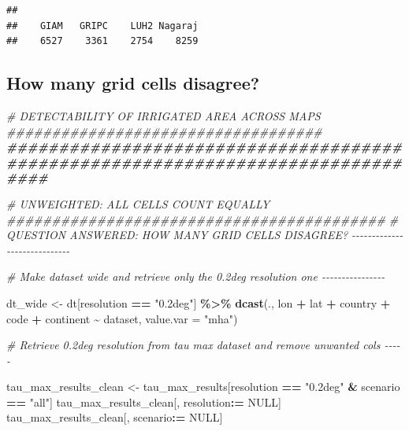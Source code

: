 \documentclass[
  11pt,
]{article}
\newenvironment{Shaded}{\begin{snugshade}}{\end{snugshade}}
\newcommand{\AttributeTok}[1]{\textcolor[rgb]{0.13,0.29,0.53}{#1}}
\newcommand{\CommentTok}[1]{\textcolor[rgb]{0.56,0.35,0.01}{\textit{#1}}}
\newcommand{\ConstantTok}[1]{\textcolor[rgb]{0.56,0.35,0.01}{#1}}
\newcommand{\DocumentationTok}[1]{\textcolor[rgb]{0.56,0.35,0.01}{\textbf{\textit{#1}}}}
\newcommand{\FunctionTok}[1]{\textcolor[rgb]{0.13,0.29,0.53}{\textbf{#1}}}
\newcommand{\NormalTok}[1]{#1}
\newcommand{\OtherTok}[1]{\textcolor[rgb]{0.56,0.35,0.01}{#1}}
\newcommand{\SpecialCharTok}[1]{\textcolor[rgb]{0.81,0.36,0.00}{\textbf{#1}}}
\newcommand{\StringTok}[1]{\textcolor[rgb]{0.31,0.60,0.02}{#1}}
\begin{document}
\begin{verbatim}
## 
##    GIAM   GRIPC    LUH2 Nagaraj 
##    6527    3361    2754    8259
\end{verbatim}

\subsection{How many grid cells
disagree?}\label{how-many-grid-cells-disagree}

\begin{Shaded}
\begin{Highlighting}[]
\CommentTok{\# DETECTABILITY OF IRRIGATED AREA ACROSS MAPS \#\#\#\#\#\#\#\#\#\#\#\#\#\#\#\#\#\#\#\#\#\#\#\#\#\#\#\#\#\#\#\#\#\#\#}
\DocumentationTok{\#\#\#\#\#\#\#\#\#\#\#\#\#\#\#\#\#\#\#\#\#\#\#\#\#\#\#\#\#\#\#\#\#\#\#\#\#\#\#\#\#\#\#\#\#\#\#\#\#\#\#\#\#\#\#\#\#\#\#\#\#\#\#\#\#\#\#\#\#\#\#\#\#\#\#\#\#\#\#\#}

\CommentTok{\# UNWEIGHTED: ALL CELLS COUNT EQUALLY \#\#\#\#\#\#\#\#\#\#\#\#\#\#\#\#\#\#\#\#\#\#\#\#\#\#\#\#\#\#\#\#\#\#\#\#\#\#\#\#\#\#}
\CommentTok{\# QUESTION ANSWERED: HOW MANY GRID CELLS DISAGREE? {-}{-}{-}{-}{-}{-}{-}{-}{-}{-}{-}{-}{-}{-}{-}{-}{-}{-}{-}{-}{-}{-}{-}{-}{-}{-}{-}{-}{-}}

\CommentTok{\# Make dataset wide and retrieve only the 0.2deg resolution one {-}{-}{-}{-}{-}{-}{-}{-}{-}{-}{-}{-}{-}{-}{-}{-}}

\NormalTok{dt\_wide }\OtherTok{\textless{}{-}}\NormalTok{ dt[resolution }\SpecialCharTok{==} \StringTok{"0.2deg"}\NormalTok{] }\SpecialCharTok{\%\textgreater{}\%}
  \FunctionTok{dcast}\NormalTok{(., lon }\SpecialCharTok{+}\NormalTok{ lat }\SpecialCharTok{+}\NormalTok{ country }\SpecialCharTok{+}\NormalTok{ code }\SpecialCharTok{+}\NormalTok{ continent }\SpecialCharTok{\textasciitilde{}}\NormalTok{ dataset, }\AttributeTok{value.var =} \StringTok{"mha"}\NormalTok{)}

\CommentTok{\# Retrieve 0.2deg resolution from tau max dataset and remove unwanted cols {-}{-}{-}{-}{-}}

\NormalTok{tau\_max\_results\_clean }\OtherTok{\textless{}{-}}\NormalTok{ tau\_max\_results[resolution }\SpecialCharTok{==} \StringTok{"0.2deg"} \SpecialCharTok{\&}\NormalTok{ scenario }\SpecialCharTok{==} \StringTok{"all"}\NormalTok{]}
\NormalTok{tau\_max\_results\_clean[, resolution}\SpecialCharTok{:=} \ConstantTok{NULL}\NormalTok{]}
\NormalTok{tau\_max\_results\_clean[, scenario}\SpecialCharTok{:=} \ConstantTok{NULL}\NormalTok{]}


\end{Highlighting}
\end{Shaded}
\end{document}
